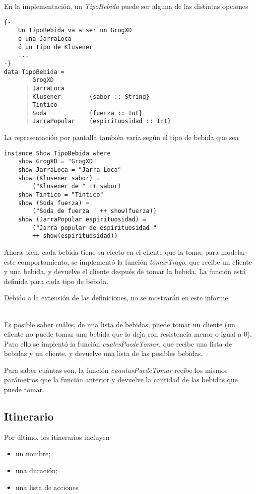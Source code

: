 En la implementación, un \emph{TipoBebida} puede ser alguna de las distintas opciones  
\clearpage
\begin{lstlisting}
{-  
    Un TipoBebida va a ser un GrogXD 
    ó una JarraLoca 
    ó un tipo de Klusener 
    ...
-}
data TipoBebida = 
        GrogXD 
      | JarraLoca
      | Klusener        {sabor :: String}
      | Tintico
      | Soda            {fuerza :: Int}
      | JarraPopular    {espirituosidad :: Int}
\end{lstlisting}

La representación por pantalla también varía según el tipo de bebida que sea
\begin{lstlisting}
instance Show TipoBebida where
    show GrogXD = "GrogXD"
    show JarraLoca = "Jarra Loca"
    show (Klusener sabor) = 
        ("Klusener de " ++ sabor)
    show Tintico = "Tintico"
    show (Soda fuerza) = 
        ("Soda de fuerza " ++ show(fuerza))
    show (JarraPopular espirituosidad) = 
        ("Jarra popular de espirituosidad " 
        ++ show(espirituosidad))
\end{lstlisting}

Ahora bien, cada bebida tiene su efecto en el cliente que la toma; para modelar este comportamiento, se implementó la función \emph{tomarTrago}, que recibe un cliente y una bebida, y devuelve el cliente después de tomar la bebida. La función está definida para cada tipo de bebida.

Debido a la extensión de las definiciones, no se mostrarán en este informe.

~\\

Es posible saber cuáles, de una lista de bebidas, puede tomar un cliente (un cliente no puede tomar una bebida que lo deja con resistencia menor o igual a 0). Para ello se implentó la función \emph{cualesPuedeTomar}, que recibe una lista de bebidas y un cliente, y devuelve una lista de las posibles bebidas.

Para saber cuántas son, la función \emph{cuantasPuedeTomar} recibe los mismos parámetros que la función anterior y devuelve la cantidad de las bebidas que puede tomar. 

\subsection{Itinerario}

Por último, los itinerarios incluyen 
\begin{itemize}
    \item un nombre;
    \item una duración;
    \item una lista de acciones
\end{itemize}

